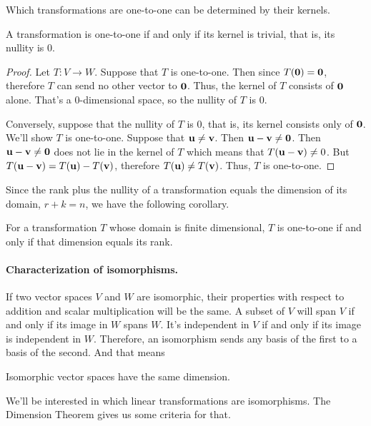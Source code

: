 Which transformations are one-to-one can be determined by their kernels.

\begin{theorem}
A transformation is one-to-one if and only if its kernel is trivial, that is, its nullity is 0.
\end{theorem}

\begin{proof}
Let $T:V\to W$.  Suppose that $T$ is one-to-one.  Then since $T({\bf 0})={\bf 0}$, therefore $T$ can send no other vector to $\bf 0$.  Thus, the kernel of $T$ consists of $\bf 0$ alone. That's a 0-dimensional space, so the nullity of $T$ is 0.

Conversely, suppose that the nullity of $T$ is 0, that is, its kernel consists only of $\bf 0$.  We'll show $T$ is one-to-one.  Suppose that ${\bf u}\neq {\bf v}$.  Then ${\bf u}-{\bf v}\neq{\bf 0}$.  Then ${\bf u}-{\bf v}\neq{\bf 0}$ does not lie in the kernel of $T$ which means that $T({\bf u}-{\bf v})\neq0$.  But $T({\bf u}-{\bf v})=T({\bf u})-T({\bf v})$, therefore $T({\bf u})\neq T({\bf v})$.  Thus, $T$ is one-to-one.
\end{proof}

Since the rank plus the nullity of a transformation equals the dimension of its domain, $r+k=n$, we have the following corollary.

\begin{corollary}
For a transformation $T$ whose domain is finite dimensional, $T$ is one-to-one if and only if that dimension equals its rank.
\end{corollary}

\paragraph{Characterization of isomorphisms.}
If two vector spaces $V$ and $W$ are isomorphic, their properties with respect to addition and scalar multiplication will be the same.  A subset of $V$ will span $V$ if and only if its image in $W$ spans $W$.  It's independent in $V$ if and only if its image is independent in $W$.  Therefore, an isomorphism sends any basis of the first to a basis of the second. And that means

\begin{theorem}
Isomorphic vector spaces have the same dimension.
\end{theorem}

We'll be interested in which linear transformations are isomorphisms.  The Dimension Theorem gives us some criteria for that.

